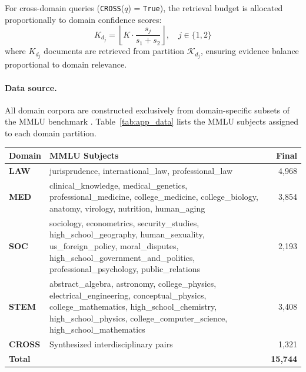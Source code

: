 \documentclass[a4paper,fleql]{cas-sc}
\begin{document}
For cross-domain queries (\texttt{CROSS}($q$) = \texttt{True}), the
retrieval budget is allocated proportionally to domain confidence scores:
\begin{equation}
    K_{d_j} = \left\lfloor K \cdot \frac{s_j}{s_1 + s_2} \right\rfloor,
    \quad j \in \{1, 2\}
    \label{eq:budget}
\end{equation}
where $K_{d_j}$ documents are retrieved from partition $\mathcal{K}_{d_j}$,
ensuring evidence balance proportional to domain relevance.


\paragraph{Data source.}
All domain corpora are constructed exclusively from domain-specific subsets of
the MMLU benchmark \citep{hendrycks2021mmlu}. Table~\ref{tab:app_data} lists
the MMLU subjects assigned to each domain partition.

\vspace{6pt plus 4pt minus 3pt}
\begin{center}
\begingroup
{}
\label{tab:app_data}
\renewcommand{\arraystretch}{1.4}
\begin{tabular}{l >{\raggedright\arraybackslash}p{9cm} r}
\toprule
\textbf{Domain} & \textbf{MMLU Subjects} & \textbf{Final} \\
\midrule
\textbf{LAW}
  & jurisprudence, international\_law, professional\_law & 4,968 \\
\midrule
\textbf{MED}
  & clinical\_knowledge, medical\_genetics, professional\_medicine,
    college\_medicine, college\_biology, anatomy, virology, nutrition,
    human\_aging & 3,854 \\
\midrule
\textbf{SOC}
  & sociology, econometrics, security\_studies,
    high\_school\_geography, human\_sexuality, us\_foreign\_policy,
    moral\_disputes, high\_school\_government\_and\_politics,
    professional\_psychology, public\_relations & 2,193 \\
\midrule
\textbf{STEM}
  & abstract\_algebra, astronomy, college\_physics,
    electrical\_engineering, conceptual\_physics, college\_mathematics,
    high\_school\_chemistry, high\_school\_physics,
    college\_computer\_science, high\_school\_mathematics & 3,408 \\
\midrule
\textbf{CROSS} & Synthesized interdisciplinary pairs & 1,321 \\
\midrule
\textbf{Total} & & \textbf{15,744} \\
\bottomrule
\end{tabular}
\endgroup
\end{center}
\vspace{6pt plus 4pt minus 3pt}
\end{document}
